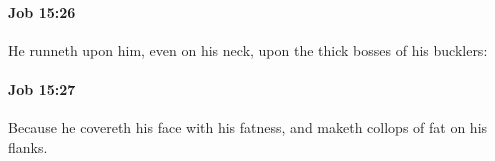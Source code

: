 		\paragraph{Job 15:26} %
			\label{JOB-15-26}

			He runneth upon him, even on his neck, upon the thick bosses of his bucklers:


		\paragraph{Job 15:27} %
			\label{JOB-15-27}

			Because he covereth his face with his fatness, and maketh collops of fat on his flanks.


